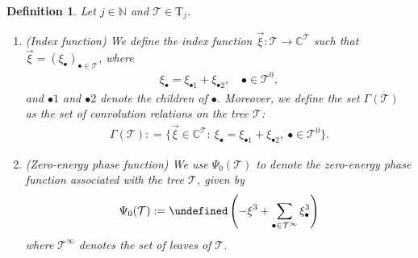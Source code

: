 \documentclass[a4paper,
11pt,  reqno]{amsart}
\newcommand{\5}{\textup{V}}
\newtheorem{definition}[theorem]{Definition}
\theoremstyle{remark}
\newcommand{\CC}{\mathbb{C}}
\newcommand{\bul}{\bullet}
\let\Re=\undefined\DeclareMathOperator*{\Re}{Re}
\newcommand{\TT}{\mathcal{T}}
\newcommand{\Tr}{\mathrm{T}}
\newcommand{\G}{\Gamma}
\newcommand{\N}{\mathbb{N}}
\numberwithin{equation}{section}
\numberwithin{theorem}{section}
\begin{document}
\begin{definition}\rm 

Let $j\in\N$ and $\TT \in \Tr_j$. 

\begin{enumerate}
\item[(i)] (Index function) 
We define the index function $\vec\xi : \TT\to \CC^\TT$ such that $\vec\xi = (\xi_\bul)_{\bul\in\TT}$, where
\begin{align}
\label{parent}
\xi_\bul = \xi_{\bul1} + \xi_{\bul2}, \quad \bul\in \TT^0,
\end{align}
and $\bul1$ and $\bul2$ denote the children of $\bul$. Moreover, we define the set $\G(\TT)$ as the set of convolution relations on the tree $\TT$:
\begin{align}
\label{Gamma}
\G(\TT) : = \big\{ \vec\xi \in \CC^\TT: \ \xi_\bul = \xi_{\bul1} + \xi_{\bul2}, \ \bul \in \TT^0 \big\}. 
\end{align}


\smallskip

\item[(ii)] (Zero-energy phase function) 
We use $\Psi_0(\TT)$ to denote the \textit{zero-energy phase function} associated with the tree $\TT$, given by
\begin{align}
\label{psi0-tree}
\Psi_0(\TT)
:=
\Re\left(- \xi^3 + \sum_{\bul\in \TT^\infty} \xi_\bul^3\right)
\end{align}
where $\TT^\infty$ denotes the set of leaves of $\TT$. 



\end{enumerate}
\end{definition}
\end{document}
